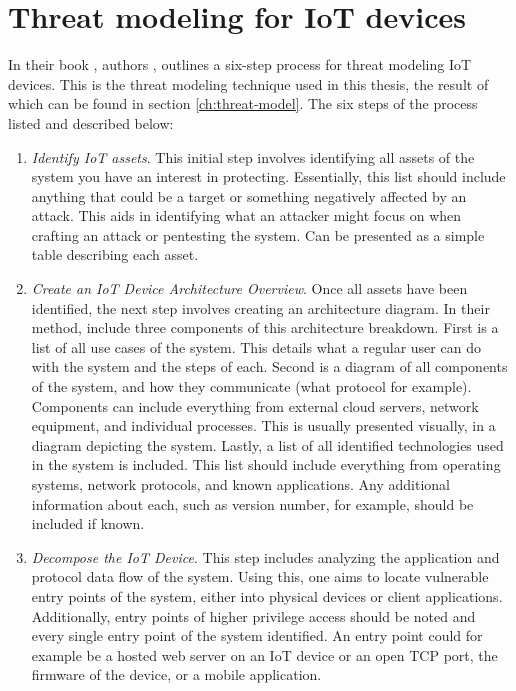 \section{Threat modeling for IoT devices} \label{ch:method:threat-modeling}
In their book , authors \citeauthor{guzman2017iot}, outlines a six-step process for threat modeling IoT devices. This is the threat modeling technique used in this thesis, the result of which can be found in section \ref{ch:threat-model}. The six steps of the process listed and described below:
\begin{enumerate}
    \item \textit{Identify IoT assets}. This initial step involves identifying all assets of the system you have an interest in protecting. Essentially, this list should include anything that could be a target or something negatively affected by an attack. This aids in identifying what an attacker might focus on when crafting an attack or pentesting the system. Can be presented as a simple table describing each asset.
    \item \textit{Create an IoT Device Architecture Overview}. Once all assets have been identified, the next step involves creating an architecture diagram. In their method, \citeauthor{guzman2017iot} include three components of this architecture breakdown. First is a list of all use cases of the system. This details what a regular user can do with the system and the steps of each. Second is a diagram of all components of the system, and how they communicate (what protocol for example). Components can include everything from external cloud servers, network equipment, and individual processes. This is usually presented visually, in a diagram depicting the system. Lastly, a list of all identified technologies used in the system is included. This list should include everything from operating systems, network protocols, and known applications. Any additional information about each, such as version number, for example, should be included if known.
    \item \textit{Decompose the IoT Device}. This step includes analyzing the application and protocol data flow of the system. Using this, one aims to locate vulnerable entry points of the system, either into physical devices or client applications. Additionally, entry points of higher privilege access should be noted and every single entry point of the system identified. An entry point could for example be a hosted web server on an IoT device or an open TCP port, the firmware of the device, or a mobile application.

\end{enumerate}
